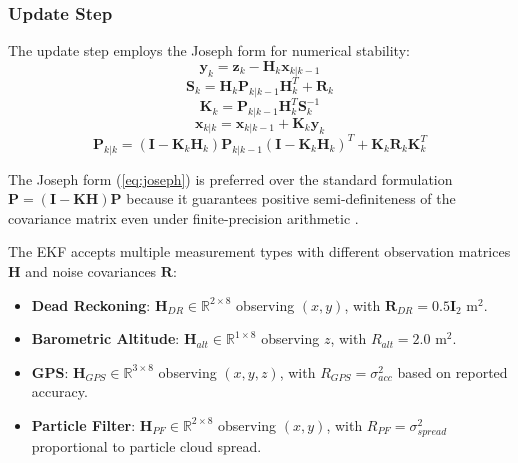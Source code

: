 \documentclass[journal,twocolumn]{IEEEtran}
\begin{document}
\subsubsection{Update Step}
The update step employs the Joseph form for numerical stability:
\begin{equation}
    \mathbf{y}_k = \mathbf{z}_k - \mathbf{H}_k \mathbf{x}_{k|k-1}
    \label{eq:innovation}
\end{equation}
\begin{equation}
    \mathbf{S}_k = \mathbf{H}_k \mathbf{P}_{k|k-1} \mathbf{H}_k^T + \mathbf{R}_k
    \label{eq:innovation_cov}
\end{equation}
\begin{equation}
    \mathbf{K}_k = \mathbf{P}_{k|k-1} \mathbf{H}_k^T \mathbf{S}_k^{-1}
    \label{eq:kalman_gain}
\end{equation}
\begin{equation}
    \mathbf{x}_{k|k} = \mathbf{x}_{k|k-1} + \mathbf{K}_k \mathbf{y}_k
    \label{eq:state_update}
\end{equation}
\begin{equation}
    \mathbf{P}_{k|k} = (\mathbf{I} - \mathbf{K}_k \mathbf{H}_k) \mathbf{P}_{k|k-1} (\mathbf{I} - \mathbf{K}_k \mathbf{H}_k)^T + \mathbf{K}_k \mathbf{R}_k \mathbf{K}_k^T
    \label{eq:joseph}
\end{equation}

The Joseph form (\ref{eq:joseph}) is preferred over the standard formulation $\mathbf{P} = (\mathbf{I} - \mathbf{KH})\mathbf{P}$ because it guarantees positive semi-definiteness of the covariance matrix even under finite-precision arithmetic \cite{bucy1968digital}.

The EKF accepts multiple measurement types with different observation matrices $\mathbf{H}$ and noise covariances $\mathbf{R}$:

\begin{itemize}
    \item \textbf{Dead Reckoning}: $\mathbf{H}_{DR} \in \mathbb{R}^{2 \times 8}$ observing $(x, y)$, with $\mathbf{R}_{DR} = 0.5\mathbf{I}_2$ m$^2$.
    \item \textbf{Barometric Altitude}: $\mathbf{H}_{alt} \in \mathbb{R}^{1 \times 8}$ observing $z$, with $R_{alt} = 2.0$ m$^2$.
    \item \textbf{GPS}: $\mathbf{H}_{GPS} \in \mathbb{R}^{3 \times 8}$ observing $(x, y, z)$, with $R_{GPS} = \sigma_{acc}^2$ based on reported accuracy.
    \item \textbf{Particle Filter}: $\mathbf{H}_{PF} \in \mathbb{R}^{2 \times 8}$ observing $(x, y)$, with $R_{PF} = \sigma_{spread}^2$ proportional to particle cloud spread.
\end{itemize}
\end{document}
